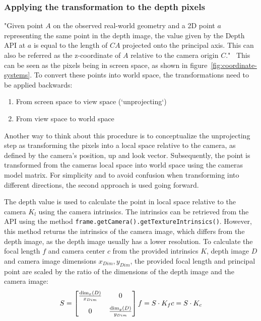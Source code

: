 \subsubsection{Applying the transformation to the depth pixels}
"Given point $A$ on the observed real-world geometry and a 2D point $a$ representing the same point in the depth image,
the value given by the Depth API at $a$ is equal to the length of $CA$ projected onto the principal axis.
This can also be referred as the z-coordinate of $A$ relative to the camera origin $C$."~\parencite{google_llc_arcore_doc}
This can be seen as the pixels being in screen space, as shown in figure~\ref{fig:coordinate-systems}.
To convert these points into world space, the transformations need to be applied backwards:
\begin{enumerate}
    \item From screen space to view space (`unprojecting`)
    \item From view space to world space
\end{enumerate}
Another way to think about this procedure is to conceptualize the unprojecting step as transforming the pixels into a local space
relative to the camera, as defined by the camera's position, up and look vector.
Subsequently, the point is transformed from the cameras local space into world space using the cameras model matrix.
For simplicity and to avoid confusion when transforming into different directions, the second approach is used going forward.


The depth value is used to calculate the point in local space relative to the camera $K_l$ using the camera intrinsics.
The intrinsics can be retrieved from the API using the method \texttt{frame.getCamera().getTextureIntrinsics()}.
However, this method returns the intrinsics of the camera image, which differs from the depth image, as the depth image usually has a lower resolution.
To calculate the focal length $f$ and camera center $c$ from the provided intrinsics $K$, depth image $D$ and camera image dimensions $x_{Dim}, y_{Dim}$,
the provided focal length and principal point are scaled by the ratio of the dimensions of the depth image and the camera image:
\begin{equation}
    S = \begin{bmatrix}
            \frac{\dim_x(D)}{x_{Dim}} & 0\\[8pt]
            0                         & \frac{\dim_y(D)}{y_{Dim}}
    \end{bmatrix}\\
    f = S \cdot K_f \\
    c = S \cdot K_c
\end{equation}

